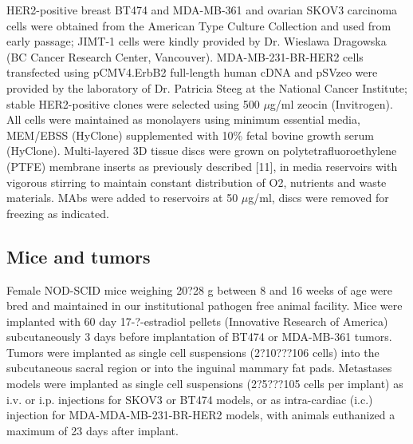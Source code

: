 HER2-positive breast BT474 and MDA-MB-361 and ovarian SKOV3 carcinoma cells were obtained from the American Type Culture Collection and used from early passage; JIMT-1 cells were kindly provided by Dr.
Wieslawa Dragowska (BC Cancer Research Center, Vancouver).
MDA-MB-231-BR-HER2 cells transfected using pCMV4.ErbB2 full-length human cDNA and pSVzeo were provided by the laboratory of Dr.
Patricia Steeg at the National Cancer Institute; stable HER2-positive clones were selected using 500 $\mu$g/ml zeocin (Invitrogen).
All cells were maintained as monolayers using minimum essential media, MEM/EBSS (HyClone) supplemented with 10\% fetal bovine growth serum (HyClone).
Multi-layered 3D tissue discs were grown on polytetrafluoroethylene (PTFE) membrane inserts as previously described [11], in media reservoirs with vigorous stirring to maintain constant distribution of O2, nutrients and waste materials.
MAbs were added to reservoirs at 50 $\mu$g/ml, discs were removed for freezing as indicated.

\subsection{Mice and tumors}

Female NOD-SCID mice weighing 20?28 g between 8 and 16 weeks of age were bred and maintained in our institutional pathogen free animal facility.
Mice were implanted with 60 day 17-?-estradiol pellets (Innovative Research of America) subcutaneously 3 days before implantation of BT474 or MDA-MB-361 tumors.
Tumors were implanted as single cell suspensions (2?10???106 cells) into the subcutaneous sacral region or into the inguinal mammary fat pads.
Metastases models were implanted as single cell suspensions (2?5???105 cells per implant) as i.v.
or i.p.
injections for SKOV3 or BT474 models, or as intra-cardiac (i.c.) injection for MDA-MDA-MB-231-BR-HER2 models, with animals euthanized a maximum of 23 days after implant.

